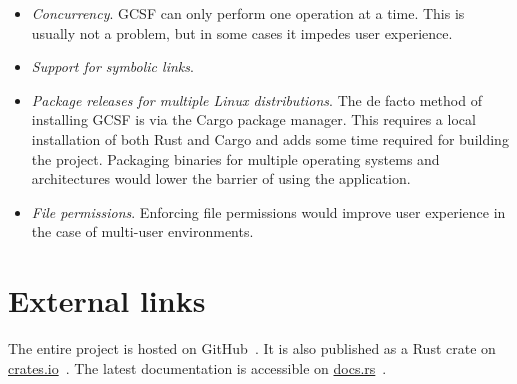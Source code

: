 \begin{itemize}
  \item \emph{Concurrency}. GCSF can only perform one operation at a time. This is usually not a problem, but in some cases it impedes user experience.
  \item \emph{Support for symbolic links}.
  \item \emph{Package releases for multiple Linux distributions}. The de facto method of installing GCSF is via the Cargo package manager. This requires a local installation of both Rust and Cargo and adds some time required for building the project. Packaging binaries for multiple operating systems and architectures would lower the barrier of using the application.
  \item \emph{File permissions}. Enforcing file permissions would improve user experience in the case of multi-user environments.
\end{itemize}

\section{External links}

The entire project is hosted on GitHub~\cite{harababurel/gcsf}. It is also published as a Rust crate on \url{crates.io}~\cite{gcsf_crate}. The latest documentation is accessible on \url{docs.rs}~\cite{gcsf_docs}.
